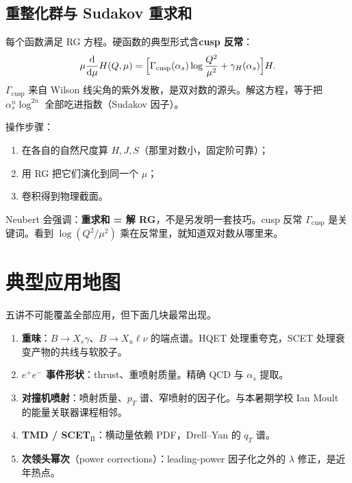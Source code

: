 \documentclass[11pt,a4paper]{article}
\theoremstyle{definition}
\theoremstyle{plain}
\theoremstyle{remark}
\newcommand{\dd}{\mathrm{d}}
\begin{document}
\subsection{重整化群与 Sudakov 重求和}

每个函数满足 RG 方程。硬函数的典型形式含\textbf{cusp 反常}：
\begin{equation}
\label{eq:rge}
  \mu\frac{\dd}{\dd\mu}H(Q,\mu)=\Bigl[\Gamma_{\mathrm{cusp}}(\alpha_s)\log\frac{Q^2}{\mu^2}+\gamma_H(\alpha_s)\Bigr]H.
\end{equation}
$\Gamma_{\mathrm{cusp}}$ 来自 Wilson 线尖角的紫外发散，是双对数的源头。解这方程，等于把 $\alpha_s^n\log^{2n}$ 全部吃进指数（Sudakov 因子）。

操作步骤：
\begin{enumerate}[leftmargin=1.6em]
  \item 在各自的自然尺度算 $H,J,S$（那里对数小，固定阶可靠）；
  \item 用 RG 把它们演化到同一个 $\mu$；
  \item 卷积得到物理截面。
\end{enumerate}

\begin{hearbox}
Neubert 会强调：\textbf{重求和 = 解 RG}，不是另发明一套技巧。cusp 反常 $\Gamma_{\mathrm{cusp}}$ 是关键词。看到 $\log(Q^2/\mu^2)$ 乘在反常里，就知道双对数从哪里来。
\end{hearbox}

\section{典型应用地图}
\label{sec:apps}

五讲不可能覆盖全部应用，但下面几块最常出现。

\begin{enumerate}[leftmargin=1.8em]
  \item \textbf{重味}：$B\to X_s\gamma$、$B\to X_u\ell\nu$ 的端点谱。HQET 处理重夸克，SCET 处理衰变产物的共线与软胶子。
  \item \textbf{$e^+e^-$ 事件形状}：thrust、重喷射质量。精确 QCD 与 $\alpha_s$ 提取。
  \item \textbf{对撞机喷射}：喷射质量、$p_T$ 谱、窄喷射的因子化。与本暑期学校 Ian Moult 的能量关联器课程相邻。
  \item \textbf{TMD / SCET$_{\mathrm{II}}$}：横动量依赖 PDF，Drell--Yan 的 $q_T$ 谱。
  \item \textbf{次领头幂次}（power corrections）：leading-power 因子化之外的 $\lambda$ 修正，是近年热点。
\end{enumerate}
\end{document}
